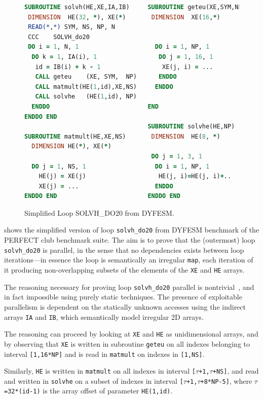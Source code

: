 \begin{figure}[bt]

\begin{lstlisting}[language=fortran]
SUBROUTINE solvh(HE,XE,IA,IB)     SUBROUTINE geteu(XE,SYM,NP)
 DIMENSION  HE(32, *), XE(*)       DIMENSION  XE(16,*)
 READ(*,*) SYM, NS, NP, N
 CCC    SOLVH_do20
 DO i = 1, N, 1                     DO i = 1, NP, 1
  DO k = 1, IA(i), 1                 DO j = 1, 16, 1
   id = IB(i) + k - 1                 XE(j, i) = ...
   CALL geteu    (XE, SYM,  NP)      ENDDO
   CALL matmult(HE(1,id),XE,NS)     ENDDO
   CALL solvhe   (HE(1,id), NP)
  ENDDO                           END
ENDDO END
                                  SUBROUTINE solvhe(HE,NP)
SUBROUTINE matmult(HE,XE,NS)       DIMENSION  HE(8, *)
  DIMENSION HE(*), XE(*)
                                   DO j = 1, 3, 1
  DO j = 1, NS, 1                   DO i = 1, NP, 1
    HE(j) = XE(j)                    HE(j, i)=HE(j, i)+..
    XE(j) = ...                     ENDDO
ENDDO END                         ENDDO END
\end{lstlisting}

\caption{Simplified Loop SOLVH\_DO20 from DYFESM.}
\label{fig:SolvhDO20Code}
\end{figure}

 shows the simplified version of loop
\texttt{solvh\_do20} from DYFESM benchmark of the PERFECT club
benchmark suite.
%
The aim is to prove that the (outermost) loop \texttt{solvh\_do20} is
parallel, in the sense that no dependencies exists between loop
iterations---in essence the loop is semantically an irregular
\texttt{map}, each iteration of it producing non-overlapping subsets
of the elements of the \texttt{XE} and \texttt{HE} arrays.

The reasoning necessary for proving loop \texttt{solvh\_do20} parallel
is nontrivial~\cite{CosPLDI}, and in fact impossible using purely
static techniques.  The presence of exploitable parallelism is
dependent on the statically unknown accesses using the indirect arrays
\texttt{IA} and \texttt{IB}, which semantically model irregular 2D
arrays.

The reasoning can proceed by looking at \texttt{XE} and \texttt{HE} as
unidimensional arrays, and by observing that \texttt{XE} is written in
subroutine \texttt{geteu} on all indexes belonging to interval
\texttt{[1,16*NP]} and is read in \texttt{matmult} on indexes in
\texttt{[1,NS]}.

Similarly, \texttt{HE} is written in \texttt{matmult} on all indexes in interval
\texttt{[$\tau$+1,$\tau$+NS]}, and read and written in \texttt{solvhe} on a subset
of indexes in interval \texttt{[$\tau$+1,$\tau$+8*NP-5]}, where
$\tau$\texttt{=32*(id-1)} is the array offset of parameter \texttt{HE(1,id)}.

